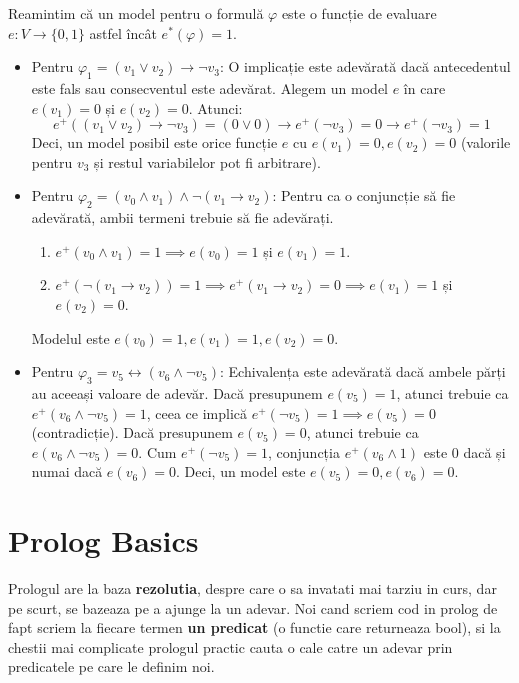 \begin{solutie}
	Reamintim că un model pentru o formulă $\varphi$ este o funcție de evaluare $e: V \to \{0, 1\}$ astfel încât $e^*(\varphi) = 1$.

	\begin{itemize}
		\item[\textbf{(i)}] Pentru $\varphi_1 = (v_1 \vee v_2) \to \neg v_3$:
			O implicație este adevărată dacă antecedentul este fals sau consecventul este adevărat.
			Alegem un model $e$ în care $e(v_1) = 0$ și $e(v_2) = 0$. Atunci:
			$$e^+((v_1 \vee v_2) \to \neg v_3) = (0 \vee 0) \to e^+(\neg v_3) = 0 \to e^+(\neg v_3) = 1$$
			Deci, un model posibil este orice funcție $e$ cu $e(v_1) = 0, e(v_2) = 0$ (valorile pentru $v_3$ și restul variabilelor pot fi arbitrare).

		\item[\textbf{(ii)}] Pentru $\varphi_2 = (v_0 \wedge v_1) \wedge \neg(v_1 \to v_2)$:
			Pentru ca o conjuncție să fie adevărată, ambii termeni trebuie să fie adevărați.
			\begin{enumerate}
				\item $e^+(v_0 \wedge v_1) = 1 \implies e(v_0) = 1$ și $e(v_1) = 1$.
				\item $e^+(\neg(v_1 \to v_2)) = 1 \implies e^+(v_1 \to v_2) = 0 \implies e(v_1) = 1$ și $e(v_2) = 0$.
			\end{enumerate}
			Modelul este $e(v_0) = 1, e(v_1) = 1, e(v_2) = 0$.

		\item[\textbf{(iii)}] Pentru $\varphi_3 = v_5 \leftrightarrow (v_6 \wedge \neg v_5)$:
			Echivalența este adevărată dacă ambele părți au aceeași valoare de adevăr.
			Dacă presupunem $e(v_5) = 1$, atunci trebuie ca $e^+(v_6 \wedge \neg v_5) = 1$, ceea ce implică $e^+(\neg v_5) = 1 \implies e(v_5) = 0$ (contradicție).
			Dacă presupunem $e(v_5) = 0$, atunci trebuie ca $e(v_6 \wedge \neg v_5) = 0$.
			Cum $e^+(\neg v_5) = 1$, conjuncția $e^+(v_6 \wedge 1)$ este $0$ dacă și numai dacă $e(v_6) = 0$.
			Deci, un model este $e(v_5) = 0, e(v_6) = 0$.
	\end{itemize}
\end{solutie}



\newpage


\section{Prolog Basics}
Prologul are la baza \textbf{rezolutia}, despre care o sa invatati mai tarziu in curs, dar pe scurt, se bazeaza pe a ajunge la un adevar.
Noi cand scriem cod in prolog de fapt scriem la fiecare termen \textbf{un predicat} (o functie care returneaza bool), si la chestii mai complicate
prologul practic cauta o cale catre un adevar prin predicatele pe care le definim noi.

